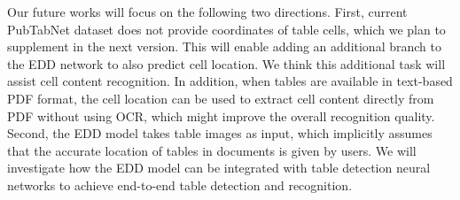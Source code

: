 \documentclass[conference]{IEEEtran}
\begin{document}
Our future works will focus on the following two directions. First, current
PubTabNet dataset does not provide coordinates of table cells, which we plan to
supplement in the next version. This will enable adding an additional branch to
the EDD network to also predict cell location. We think this additional task
will assist cell content recognition. In addition, when tables are available in
text-based PDF format, the cell location can be used to extract cell content
directly from PDF without using OCR, which might improve the overall recognition
quality. Second, the EDD model takes table images as input, which implicitly
assumes that the accurate location of tables in documents is given by users. We
will investigate how the EDD model can be integrated with table detection neural
networks to achieve end-to-end table detection and recognition.



\end{document}
